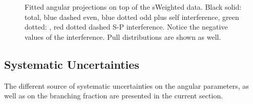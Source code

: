 \begin{figure}[!h]
\centering
  \begin{subfigure}{0.5\textwidth}
    \scalebox{1.15}{}
    \caption{}
    \label{angPlot_ctk}
  \end{subfigure}%
  \hfill%
  \begin{subfigure}{0.5\textwidth}
    \scalebox{1.15}{}
    \caption{}
    \label{angPlot_ctl}
  \end{subfigure}
  \begin{subfigure}{0.5\textwidth}
    \scalebox{1.15}{}
    \caption{}
    \label{angPlot_phi}
  \end{subfigure}
  \caption{Fitted angular \pdf projections on top of the \BsJpsiKst sWeighted data.
           Black solid: total, blue dashed \pwave even, blue dotted \pwave odd plus \pwave self interference,
           green dotted: \swave, red dotted dashed S-P interference. Notice the negative values of the \spwave interference.
           Pull distributions are shown as well.}
  \label{angular_plot}
\end{figure}



\subsection{Systematic Uncertainties}
\label{systemics}
The different source of systematic uncertainties on the \Bs angular parameters, as well as on the branching fraction
are presented in the current section.

